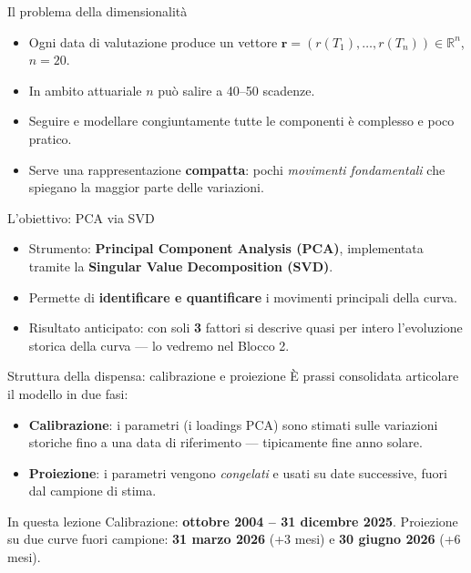 \documentclass[11pt,aspectratio=169]{beamer}
\newcommand{\R}{\mathbb{R}}
\begin{document}
\begin{frame}{Il problema della dimensionalità}
\begin{itemize}
  \item Ogni data di valutazione produce un vettore
        $\mathbf{r} = (r(T_1),\ldots,r(T_n)) \in \R^n$, $n=20$.
  \item In ambito attuariale $n$ può salire a 40--50 scadenze.
  \item Seguire e modellare congiuntamente tutte le componenti è complesso e poco pratico.
  \item[$\Rightarrow$] Serve una rappresentazione \textbf{compatta}: pochi
        \emph{movimenti fondamentali} che spiegano la maggior parte delle variazioni.
\end{itemize}
\end{frame}

\begin{frame}{L'obiettivo: PCA via SVD}
\begin{itemize}
  \item Strumento: \textbf{Principal Component Analysis (PCA)}, implementata tramite la
        \textbf{Singular Value Decomposition (SVD)}.
  \item Permette di \textbf{identificare e quantificare} i movimenti principali della curva.
  \item Risultato anticipato: con soli \textbf{3} fattori si descrive quasi per intero
        l'evoluzione storica della curva --- lo vedremo nel Blocco 2.
\end{itemize}
\end{frame}

\begin{frame}{Struttura della dispensa: calibrazione e proiezione}
\`E prassi consolidata articolare il modello in due fasi:
\begin{itemize}
  \item \textbf{Calibrazione}: i parametri (i loadings PCA) sono stimati sulle variazioni
        storiche fino a una data di riferimento --- tipicamente fine anno solare.
  \item \textbf{Proiezione}: i parametri vengono \emph{congelati} e usati su date successive,
        fuori dal campione di stima.
\end{itemize}
\begin{block}{In questa lezione}
Calibrazione: \textbf{ottobre 2004 -- 31 dicembre 2025}. Proiezione su due curve fuori
campione: \textbf{31 marzo 2026} (+3 mesi) e \textbf{30 giugno 2026} (+6 mesi).
\end{block}
\end{frame}
\end{document}
